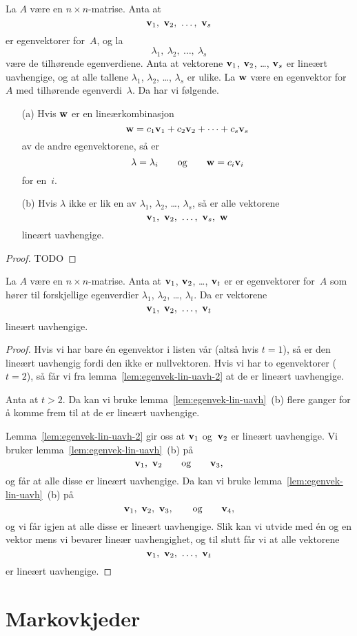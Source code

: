 \begin{lem}
\label{lem:egenvek-lin-uavh}
La $A$ være en $n \times n$-matrise.  Anta at
\[
\V{v}_1,\ \V{v}_2,\ \ldots,\ \V{v}_s
\]
er egenvektorer for~$A$, og la
\[
\lambda_1,\ \lambda_2,\ \ldots,\ \lambda_s
\]
være de tilhørende egenverdiene.  Anta at vektorene $\mathbf{v}_1$,
$\mathbf{v}_2$, \ldots, $\mathbf{v}_s$ er lineært uavhengige, og at alle tallene
$\lambda_1$, $\lambda_2$, \ldots, $\lambda_s$ er ulike.  La $\mathbf{w}$
være en egenvektor for~$A$ med tilhørende egenverdi~$\lambda$.  Da har
vi følgende.
\begin{enumerate}
\item[(a)] Hvis $\mathbf{w}$ er en lineærkombinasjon
\[
\mathbf{w} = c_1 \mathbf{v}_1 + c_2 \mathbf{v}_2 + \cdots + c_s \mathbf{v}_s
\]
av de andre egenvektorene, så er
\[
\lambda = \lambda_i
\qquad\text{og}\qquad
\mathbf{w} = c_i \mathbf{v}_i
\]
for en~$i$.
\item[(b)] Hvis $\lambda$ ikke er lik en av $\lambda_1$, $\lambda_2$,
\ldots, $\lambda_s$, så er alle vektorene
\[
\V{v}_1,\ \V{v}_2,\ \ldots,\ \V{v}_s,\ \V{w}
\]
lineært uavhengige.
\end{enumerate}
\end{lem}
\begin{proof}
TODO
\end{proof}

\begin{thm}
\label{thm:egenvek-lin-uavh}
La $A$ være en $n \times n$-matrise.  Anta at $\mathbf{v}_1$, $\mathbf{v}_2$,
\ldots, $\mathbf{v}_t$ er er egenvektorer for~$A$ som hører til
forskjellige egenverdier $\lambda_1$, $\lambda_2$, \ldots,
$\lambda_t$.
Da er vektorene
\[
\V{v}_1,\ \V{v}_2,\ \ldots,\ \V{v}_t
\]
lineært uavhengige.
\end{thm}
\begin{proof}
Hvis vi har bare én egenvektor i listen vår (altså hvis $t=1$), så er
den lineært uavhengig fordi den ikke er nullvektoren.  Hvis vi har to
egenvektorer ($t=2$), så får vi fra lemma~\ref{lem:egenvek-lin-uavh-2}
at de er lineært uavhengige.

Anta at $t > 2$.  Da kan vi bruke lemma~\ref{lem:egenvek-lin-uavh}~(b)
flere ganger for å komme frem til at de er lineært uavhengige.

Lemma~\ref{lem:egenvek-lin-uavh-2} gir oss at $\mathbf{v}_1$ og~$\mathbf{v}_2$
er lineært uavhengige.  Vi bruker lemma~\ref{lem:egenvek-lin-uavh}~(b)
på
\[
\mathbf{v}_1,\ \mathbf{v}_2
\qquad\text{og}\qquad
\mathbf{v}_3,
\]
og får at alle disse er lineært uavhengige.  Da kan vi bruke
lemma~\ref{lem:egenvek-lin-uavh}~(b) på
\[
\mathbf{v}_1,\ \mathbf{v}_2,\ \mathbf{v}_3,
\qquad\text{og}\qquad
\mathbf{v}_4,
\]
og vi får igjen at alle disse er lineært uavhengige.  Slik kan vi
utvide med én og en vektor mens vi bevarer lineær uavhengighet, og til
slutt får vi at alle vektorene
\[
\V{v}_1,\ \V{v}_2,\ \ldots,\ \V{v}_t
\]
er lineært uavhengige.
\end{proof}


\section*{Markovkjeder}



\kapittelslutt
